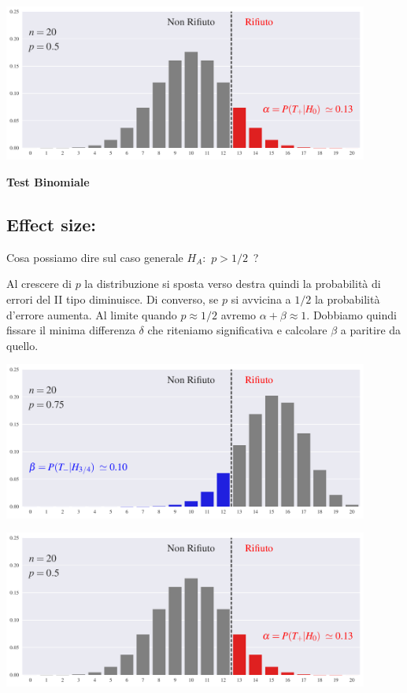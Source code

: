 \documentclass[12pt,openany]{book}
\theoremstyle{mio}
\theoremstyle{liscio}
\begin{document}
\hfil\includegraphics[width=0.9\textwidth]{figure/B-test_01.pdf}




\clearpage\hfill\textbf{Test Binomiale}\subsection{Effect size: \boldmath{$\delta$}}


Cosa possiamo dire sul caso generale $H_A:$ $p>1/2$~?

Al crescere di $p$ la distribuzione si sposta verso destra quindi la probabilità di errori del II tipo diminuisce. Di converso, se $p$ si avvicina a $1/2$  la probabilità d'errore aumenta. Al limite quando $p\approx 1/2$ avremo $\alpha+\beta\approx 1$. Dobbiamo quindi fissare il minima differenza $\delta$ che riteniamo significativa e calcolare $\beta$ a paritire da quello.


\hfil\includegraphics[width=0.9\textwidth]{figure/B-test_02.pdf}

\hfil\includegraphics[width=0.9\textwidth]{figure/B-test_01.pdf}
\end{document}
